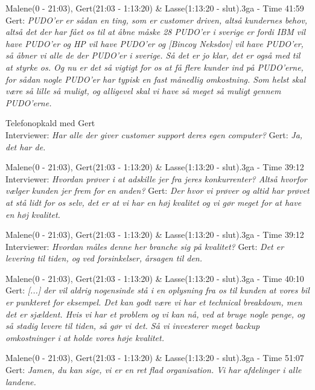 \begin{thebibliography}{9}
	Malene(0 - 21:03), Gert(21:03 - 1:13:20) \& Lasse(1:13:20 - slut).3ga - Time 41:59\\
	Gert: \textit{PUDO’er er sådan en ting, som er customer driven, altså kundernes behov, altså det der har fået os til at åbne måske 28 PUDO’er i sverige er fordi IBM vil have PUDO’er og HP vil have PUDO’er og [Bincoy Neksdov] vil have PUDO’er, så åbner vi alle de der PUDO’er i sverige. Så det er jo klar, det er også med til at styrke os. Og nu er det så vigtigt for os at få flere kunder ind på PUDO’erne, for sådan nogle PUDO’er har typisk en fast månedlig omkostning. Som helst skal være så lille så muligt, og alligevel skal vi have så meget så muligt gennem PUDO’erne.}

	Telefonopkald med Gert\\
	Interviewer: \textit{Har alle der giver customer support deres egen computer?} Gert: \textit{Ja, det har de.}

	Malene(0 - 21:03), Gert(21:03 - 1:13:20) \& Lasse(1:13:20 - slut).3ga - Time 39:12\\
	Interviewer: \textit{Hvordan prøver i at adskille jer fra jeres konkurrenter? Altså hvorfor vælger kunden jer frem for en anden?} Gert: 	\textit{Der hvor vi prøver og altid har prøvet at stå lidt for os selv, det er at vi har en høj kvalitet og vi gør meget for at have en høj kvalitet.}

	Malene(0 - 21:03), Gert(21:03 - 1:13:20) \& Lasse(1:13:20 - slut).3ga - Time 39:12\\
	Interviewer: \textit{Hvordan måles denne her branche sig på kvalitet?} Gert: 	\textit{Det er levering til tiden, og ved forsinkelser, årsagen til den.}

	Malene(0 - 21:03), Gert(21:03 - 1:13:20) \& Lasse(1:13:20 - slut).3ga - Time 40:10\\
	Gert: \textit{[...] der vil aldrig nogensinde stå i en oplysning fra os til kunden at vores bil er punkteret for eksempel. Det kan godt være vi har et technical breakdown, men det er sjældent. Hvis vi har et problem og vi kan nå, ved at bruge nogle penge, og så stadig levere til tiden, så gør vi det. Så vi investerer meget backup omkostninger i at holde vores høje kvalitet.}

	Malene(0 - 21:03), Gert(21:03 - 1:13:20) \& Lasse(1:13:20 - slut).3ga - Time 51:07\\
	Gert: \textit{Jamen, du kan sige, vi er en ret flad organisation. Vi har afdelinger i alle landene.}


\end{thebibliography}

